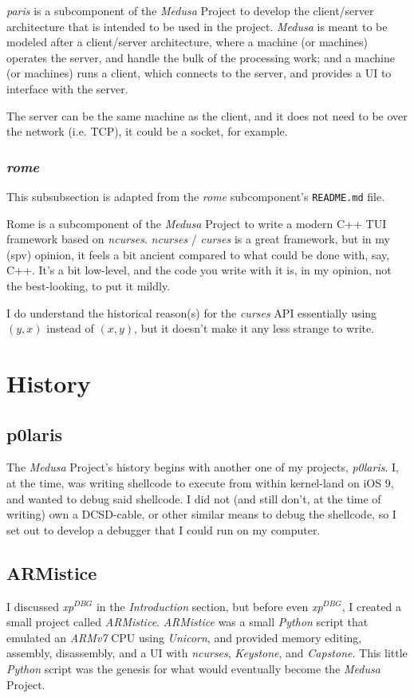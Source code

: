 \documentclass{article}
\newcommand{\xpDBG}{\textit{xp$^{DBG}$}\xspace}
\begin{document}
	\textit{paris} is a subcomponent of the \textit{Medusa} Project to develop
	the client/server architecture that is intended to be used in the project.
	\textit{Medusa} is meant to be modeled after a client/server architecture,
	where a machine (or machines) operates the server, and handle the bulk of
	the processing work; and a machine (or machines) runs a client, which
	connects to the server, and provides a UI to interface with the server.

	The server can be the same machine as the client, and it does not need to be
	over the network (i.e. TCP), it could be a socket, for example.

	\subsubsection{\textit{rome}}
	This subsubsection is adapted from the \textit{rome} subcomponent's
	\texttt{README.md} file.

	Rome is a subcomponent of the \textit{Medusa} Project to write a modern C++
	TUI framework based on \textit{ncurses}. \textit{ncurses} / \textit{curses}
	is a great framework, but in my (spv) opinion, it feels a bit ancient
	compared to what could be done with, say, C++. It's a bit low-level, and the
	code you write with it is, in my opinion, not the best-looking, to put it
	mildly.

	I do understand the historical reason(s) for the \textit{curses} API
	essentially using $(y,x)$ instead of $(x,y)$, but it doesn't make it any
	less strange to write.

	\section{History}
	\subsection{p0laris}
	The \textit{Medusa} Project's history begins with another one of my
	projects, \textit{p0laris}. I, at the time, was writing shellcode to execute
	from within kernel-land on iOS 9, and wanted to debug said shellcode. I did
	not (and still don't, at the time of writing) own a DCSD-cable, or other
	similar means to debug the shellcode, so I set out to develop a debugger
	that I could run on my computer.

	\subsection{ARMistice}
	I discussed \xpDBG in the \textit{Introduction} section, but before even
	\xpDBG, I created a small project called \textit{ARMistice}.
	\textit{ARMistice} was a small \textit{Python} script that emulated an
	\textit{ARMv7} CPU using \textit{Unicorn}, and provided memory editing,
	assembly, disassembly, and a UI with \textit{ncurses}, \textit{Keystone},
	and \textit{Capstone}. This little \textit{Python} script was the genesis
	for what would eventually become the \textit{Medusa} Project.
\end{document}
